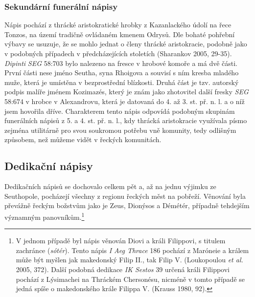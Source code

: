 \subsubsection[sekundární-funerální-nápisy-2]{Sekundární funerální nápisy}

Nápis pochází z thrácké aristokratické hrobky z Kazanlackého údolí na řece Tonzos, na území tradičně ovládaném kmenem Odrysů. Dle bohaté pohřební výbavy se usuzuje, že se mohlo jednat o členy thrácké aristokracie, podobně jako v podobných případech v předcházejících stoletích (Sharankov 2005, 29-35). {\em Dipinti} {\em SEG} 58:703 bylo nalezeno na fresce v hrobové komoře a má dvě části. První části nese jméno Seutha, syna Rhoigova a souvisí s ním kresba mladého muže, která je umístěna v bezprostřední blízkosti. Druhá část je tzv. autorský podpis malíře jménem Kozimazés, který je znám jako zhotovitel další fresky {\em SEG} 58:674 v hrobce v Alexandrovu, která je datovaná do 4. až 3. st. př. n. l. a o níž jsem hovořila dříve. Charakterem tento nápis odpovídá podobným skupinám funerálních nápisů z 5. a 4. st. př. n. l., kdy thrácká aristokracie využívala písmo zejména utilitárně pro svou soukromou potřebu vně komunity, tedy odlišným způsobem, než můžeme vidět v řeckých komunitách.

\subsection[dedikační-nápisy-5]{Dedikační nápisy}

Dedikačních nápisů se dochovalo celkem pět a, až na jednu výjimku ze Seuthopole, pocházejí všechny z regionu řeckých měst na pobřeží. Věnování byla převážně řeckým božstvům jako je Zeus, Dionýsos a Démétér, případně tehdejším významným panovníkům.\footnote{V jednom případě byl nápis věnován Diovi a králi Filippovi, s titulem zachránce ({\em sótér}). Tento nápis {\em I Aeg Thrace} 186 pochází z Maróneie a králem může být myšlen jak makedonský Filip II., tak Filip V. (Loukopoulou {\em et al.} 2005, 372). Další podobná dedikace {\em IK Sestos} 39 určená králi Filippovi pochází z Lýsimachei na Thráckém Chersonésu, nicméně v tomto případě se jedná spíše o makedonského krále Filippa V. (Krauss 1980, 92).}

